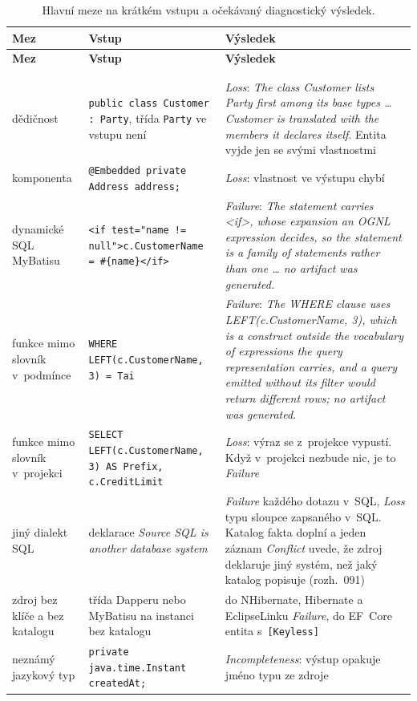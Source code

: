 {\footnotesize
\begin{longtable}{P{0.19} P{0.34} P{0.47}}
\toprule
\textbf{Mez} & \textbf{Vstup} & \textbf{Výsledek} \\
\midrule
\endfirsthead
\toprule
\textbf{Mez} & \textbf{Vstup} & \textbf{Výsledek} \\
\midrule
\endhead
\rule{0pt}{26pt}\\
\endfoot
\bottomrule
\caption{Hlavní meze na krátkém vstupu a očekávaný diagnostický výsledek.}\label{tab:limity-priklady}\\
\endlastfoot
dědičnost & \texttt{public class Customer : Party}, třída \texttt{Party} ve vstupu není & \emph{Loss}: \emph{The class Customer lists Party first among its base types \ldots{} Customer is translated with the members it declares itself}. Entita vyjde jen se svými vlastnostmi \\
komponenta & \texttt{@Embedded private Address address;} & \emph{Loss}: vlastnost ve výstupu chybí \\
dynamické SQL MyBatisu & \texttt{<if test="name != null"{}>c.CustomerName = \#\{name\}</if>} & \emph{Failure}: \emph{The statement carries <if>, whose expansion an OGNL expression decides, so the statement is a family of statements rather than one \ldots{} no artifact was generated.} \\
funkce mimo slovník v~podmínce & \texttt{WHERE LEFT(c.CustomerName, 3) = \textquotesingle{}Tai\textquotesingle{}} & \emph{Failure}: \emph{The WHERE clause uses \textquotesingle{}LEFT(c.CustomerName, 3)\textquotesingle{}, which is a construct outside the vocabulary of expressions the query representation carries, and a query emitted without its filter would return different rows; no artifact was generated.} \\
funkce mimo slovník v~projekci & \texttt{SELECT LEFT(c.CustomerName, 3) AS Prefix, c.CreditLimit} & \emph{Loss}: výraz se z~projekce vypustí. Když v~projekci nezbude nic, je to \emph{Failure} \\
jiný dialekt SQL & deklarace \emph{Source SQL is another database system} & \emph{Failure} každého dotazu v~SQL, \emph{Loss} typu sloupce zapsaného v~SQL. Katalog fakta doplní a jeden záznam \emph{Conflict} uvede, že zdroj deklaruje jiný systém, než jaký katalog popisuje (rozh.~091) \\
zdroj bez klíče a bez katalogu & třída Dapperu nebo MyBatisu na instanci bez katalogu & do NHibernate, Hibernate a EclipseLinku \emph{Failure}, do EF~Core entita s~\texttt{[Keyless]} \\
neznámý jazykový typ & \texttt{private java.time.Instant createdAt;} & \emph{Incompleteness}: výstup opakuje jméno typu ze zdroje \\
\end{longtable}}


